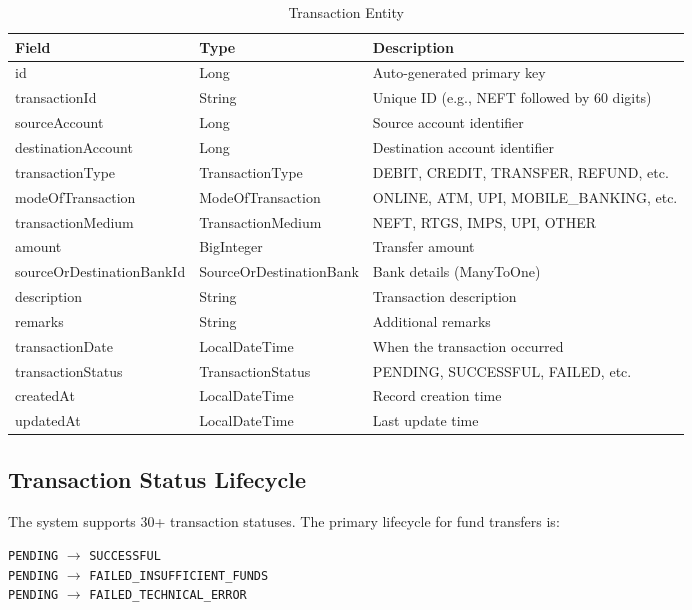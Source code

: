 \documentclass[12pt,a4paper]{report}
\begin{document}
\begin{table}[H]
\centering
\caption{Transaction Entity}
\begin{tabularx}{\textwidth}{llX}
\toprule
\textbf{Field} & \textbf{Type} & \textbf{Description} \\
\midrule
id & Long & Auto-generated primary key \\
transactionId & String & Unique ID (e.g., NEFT followed by 60 digits) \\
sourceAccount & Long & Source account identifier \\
destinationAccount & Long & Destination account identifier \\
transactionType & TransactionType & DEBIT, CREDIT, TRANSFER, REFUND, etc. \\
modeOfTransaction & ModeOfTransaction & ONLINE, ATM, UPI, MOBILE\_BANKING, etc. \\
transactionMedium & TransactionMedium & NEFT, RTGS, IMPS, UPI, OTHER \\
amount & BigInteger & Transfer amount \\
sourceOrDestinationBankId & SourceOrDestinationBank & Bank details (ManyToOne) \\
description & String & Transaction description \\
remarks & String & Additional remarks \\
transactionDate & LocalDateTime & When the transaction occurred \\
transactionStatus & TransactionStatus & PENDING, SUCCESSFUL, FAILED, etc. \\
createdAt & LocalDateTime & Record creation time \\
updatedAt & LocalDateTime & Last update time \\
\bottomrule
\end{tabularx}
\end{table}

\subsection{Transaction Status Lifecycle}
The system supports 30+ transaction statuses. The primary lifecycle for fund transfers is:

\begin{center}
\texttt{PENDING} $\rightarrow$ \texttt{SUCCESSFUL} \\
\texttt{PENDING} $\rightarrow$ \texttt{FAILED\_INSUFFICIENT\_FUNDS} \\
\texttt{PENDING} $\rightarrow$ \texttt{FAILED\_TECHNICAL\_ERROR}
\end{center}
\end{document}
